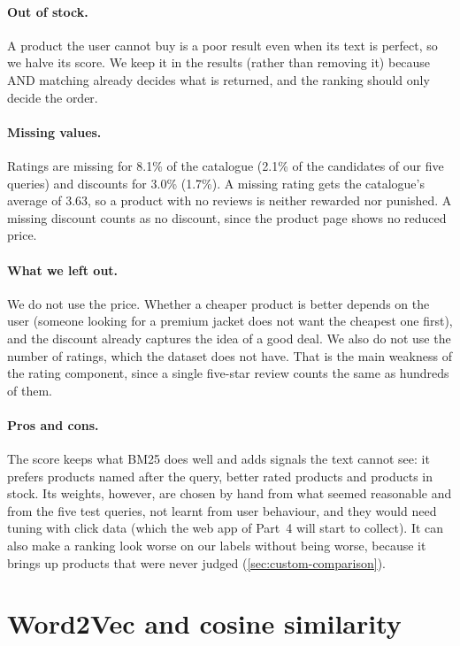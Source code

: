 \documentclass[11pt,a4paper]{article}
\begin{document}
\paragraph{Out of stock.} A product the user cannot buy is a poor result even
when its text is perfect, so we halve its score. We keep it in the results
(rather than removing it) because AND matching already decides what is
returned, and the ranking should only decide the order.

\paragraph{Missing values.} Ratings are missing for 8.1\% of the catalogue
(2.1\% of the candidates of our five queries) and discounts for 3.0\% (1.7\%).
A missing rating gets the catalogue's average of 3.63, so a product with no
reviews is neither rewarded nor punished. A missing discount counts as no
discount, since the product page shows no reduced price.

\paragraph{What we left out.} We do not use the price. Whether a cheaper
product is better depends on the user (someone looking for a premium jacket
does not want the cheapest one first), and the discount already captures the
idea of a good deal. We also do not use the number of ratings, which the
dataset does not have. That is the main weakness of the rating component,
since a single five-star review counts the same as hundreds of them.

\paragraph{Pros and cons.} The score keeps what BM25 does well and adds
signals the text cannot see: it prefers products named after the query, better
rated products and products in stock. Its weights, however, are chosen by hand
from what seemed reasonable and from the five test queries, not learnt from
user behaviour, and they would need tuning with click data (which the web app
of Part~4 will start to collect). It can also make a ranking look worse on our
labels without being worse, because it brings up products that were never
judged (\cref{sec:custom-comparison}).

\section{Word2Vec and cosine similarity}
\end{document}
